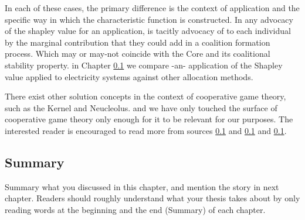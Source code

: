 


In each of these cases, the primary difference is the context of application and the specific way in which the characteristic function is constructed.
In any advocacy of the shapley value for an application, is tacitly advocacy of to each individual by the marginal contribution that they could add in a coalition formation process.
Which may or may-not coincide with the Core and its coalitional stability property.
in Chapter \ref{} we compare -an- application of the Shapley value applied to electricity systems against other allocation methods.

There exist other solution concepts in the context of cooperative game theory, such as the Kernel and Neucleolus. and we have only touched the surface of cooperative game theory only enough for it to be relevant for our purposes.
The interested reader is encouraged to read more from sources \ref{} and \ref{} and \ref{}.



\subsection{Summary}
Summary what you discussed in this chapter, and mention the story in next
chapter. Readers should roughly understand what your thesis takes about by only reading
words at the beginning and the end (Summary) of each chapter.




